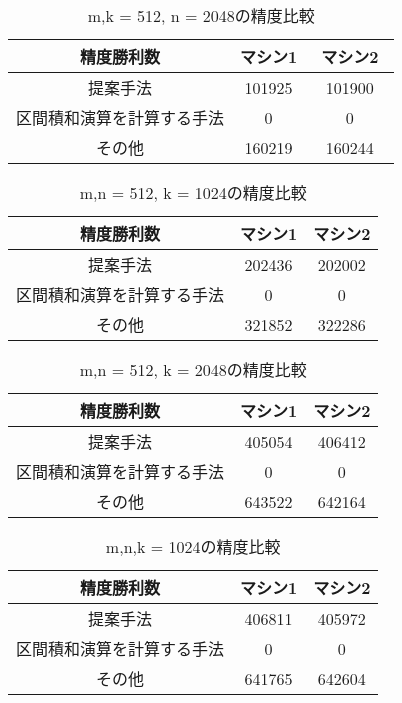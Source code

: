 \documentclass[11pt,a4paper]{jsreport}
\theoremstyle{definition}
\begin{document}
\begin{table}[H]
\centering
\small
\caption{m,k = 512, n = 2048の精度比較}
\begin{tabular}{c|c|c}
\hline
精度勝利数 & マシン1 & マシン2　\\ \hline \hline
提案手法 & 101925 & 101900 \\ \hline
区間積和演算を計算する手法 & 0 & 0  \\ \hline
その他 & 160219 & 160244 \\ \hline
\end{tabular}
\end{table}

\begin{table}[H]
\centering
\small
\caption{m,n = 512, k = 1024の精度比較}
\begin{tabular}{c|c|c}
\hline
精度勝利数 & マシン1 & マシン2 \\ \hline \hline
提案手法 & 202436 & 202002 \\ \hline
区間積和演算を計算する手法 & 0 & 0 \\ \hline
その他 & 321852 & 322286 \\ \hline
\end{tabular}
\end{table}

\begin{table}[H]
\centering
\small
\caption{m,n = 512, k = 2048の精度比較}
\begin{tabular}{c|c|c}
\hline
精度勝利数 & マシン1 & マシン2\\ \hline \hline
提案手法 & 405054 & 406412\\ \hline
区間積和演算を計算する手法 & 0 & 0 \\ \hline
その他 & 643522 & 642164 \\ \hline
\end{tabular}
\end{table}

\begin{table}[H]
\centering
\small
\caption{m,n,k = 1024の精度比較}
\begin{tabular}{c|c|c}
\hline
精度勝利数 & マシン1 & マシン2 \\ \hline \hline
提案手法 & 406811 & 405972 \\ \hline
区間積和演算を計算する手法 & 0 & 0 \\ \hline
その他 & 641765 & 642604 \\ \hline
\end{tabular}
\end{table}
\end{document}
